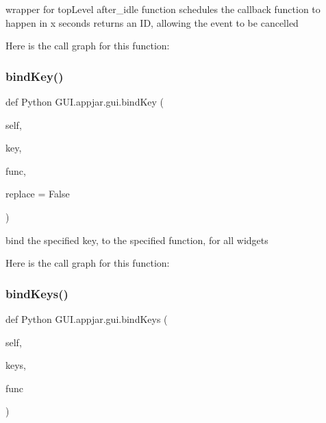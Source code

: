 \begin{DoxyVerb}wrapper for topLevel after_idle function
    schedules the callback function to happen in x seconds
    returns an ID, allowing the event to be cancelled \end{DoxyVerb}
 Here is the call graph for this function\+:
\mbox{\label{class_python_01_g_u_i_1_1appjar_1_1gui_a68a4e36d40eefea11a8c049462ea0873}} 
\subsubsection{\texorpdfstring{bind\+Key()}{bindKey()}}
{\footnotesize\ttfamily def Python G\+U\+I.\+appjar.\+gui.\+bind\+Key (\begin{DoxyParamCaption}\item[{}]{self,  }\item[{}]{key,  }\item[{}]{func,  }\item[{}]{replace = {\ttfamily False} }\end{DoxyParamCaption})}

\begin{DoxyVerb}bind the specified key, to the specified function, for all widgets \end{DoxyVerb}
 Here is the call graph for this function\+:
\mbox{\label{class_python_01_g_u_i_1_1appjar_1_1gui_a571b02f7cf42cd691f09377be5148f89}} 
\subsubsection{\texorpdfstring{bind\+Keys()}{bindKeys()}}
{\footnotesize\ttfamily def Python G\+U\+I.\+appjar.\+gui.\+bind\+Keys (\begin{DoxyParamCaption}\item[{}]{self,  }\item[{}]{keys,  }\item[{}]{func }\end{DoxyParamCaption})}

